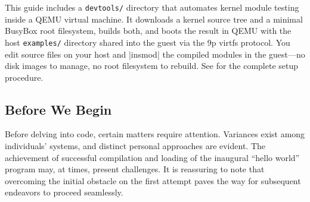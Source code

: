 \documentclass[10pt, oneside]{book}
\begin{document}
This guide includes a \verb|devtools/| directory that automates kernel module testing
inside a QEMU virtual machine.
It downloads a kernel source tree and a minimal BusyBox root filesystem, builds both,
and boots the result in QEMU with the host \verb|examples/| directory shared into the
guest via the 9p virtfs protocol.
You edit source files on your host and \sh|insmod| the compiled modules in the guest---no
disk images to manage, no root filesystem to rebuild.
See  for the complete setup procedure.

\subsection{Before We Begin}
\label{sec:preparation}
Before delving into code, certain matters require attention.
Variances exist among individuals' systems, and distinct personal approaches are evident.
The achievement of successful compilation and loading of the inaugural ``hello world'' program may,
at times, present challenges.
It is reassuring to note that overcoming the initial obstacle on the first attempt paves the way for subsequent endeavors to proceed seamlessly.
\end{document}
